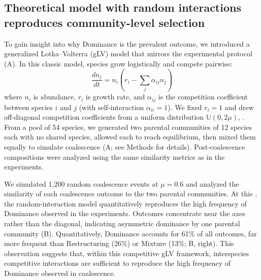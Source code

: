 \subsection{Theoretical model with random interactions reproduces community-level selection}
\label{sec:results:glv_model}
To gain insight into why Dominance is the prevalent outcome, we introduced a generalized Lotka--Volterra (gLV) model \citep{May1972, Grilli2017} that mirrors the experimental protocol (A). In this classic model, species grow logistically and compete pairwise:
\begin{equation}
\frac{dn_i}{dt} = n_i \left( r_i - \sum_j \alpha_{ij} n_j \right)
\label{eq:glv}
\end{equation}
where $n_i$ is abundance, $r_i$ is growth rate, and $\alpha_{ij}$ is the competition coefficient between species $i$ and $j$ (with self-interaction $\alpha_{ii} = 1$). We fixed $r_i = 1$ and drew off-diagonal competition coefficients from a uniform distribution $\mathbb{U}(0, 2\mu)$,  \citep{Hu2022,Hu2025}. From a pool of 54 species, we generated two parental communities of 12 species each with no shared species, allowed each to reach equilibrium, then mixed them equally to simulate coalescence (A; see Methods for details). Post-coalescence compositions were analyzed using the same similarity metrics as in the experiments. 

We simulated 1,200 random coalescence events at  $\mu = 0.6$ and analyzed the similarity of each coalescence outcome to the two parental communities. At this , the random-interaction model quantitatively reproduces the high frequency of Dominance observed in the experiments. Outcomes concentrate near the axes rather than the diagonal, indicating asymmetric dominance by one parental community (B). Quantitatively, Dominance accounts for 61\% of all outcomes, far more frequent than Restructuring (26\%) or Mixture (13\%; B, right). This observation suggests that, within this competitive gLV framework, interspecies competitive interactions are sufficient to reproduce the high frequency of Dominance observed in coalescence.

